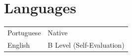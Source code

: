 \documentclass[10pt, a4paper]{article}
\newcommand{\TablePad}{\vspace{-0.4cm}}
\begin{document}

\section*{Languages}

\TablePad
\begin{tabularx}{\textwidth}{@{}p{} p{}@{}}
	Portuguese & Native                    
	\\
	English    & B Level (Self-Evaluation) 
\end{tabularx}

\end{document}
